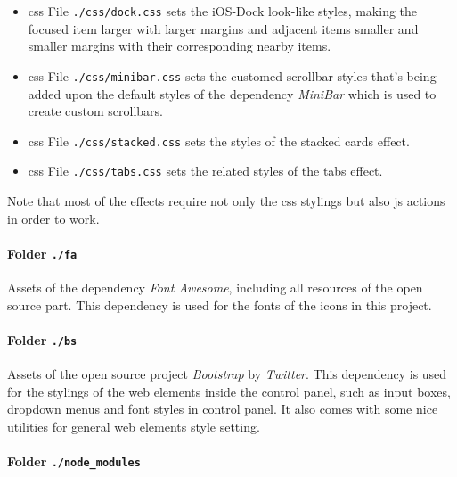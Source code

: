 \begin{itemize}
\item \gls{css} File \texttt{./css/dock.css} sets the iOS-Dock look-like styles, making the focused item larger with larger margins and adjacent items smaller and smaller margins with their corresponding nearby items.
\item \gls{css} File \texttt{./css/minibar.css} sets the customed scrollbar styles that's being added upon the default styles of the dependency \emph{MiniBar} which is used to create custom scrollbars.
\item \gls{css} File \texttt{./css/stacked.css} sets the styles of the stacked cards effect.
\item \gls{css} File \texttt{./css/tabs.css} sets the related styles of the tabs effect.
\end{itemize}

Note that most of the effects require not only the \gls{css} stylings but also \gls{js} actions in order to work.

\paragraph{Folder \texttt{./fa}}

Assets of the dependency \emph{Font Awesome}, including all resources of the open source part. This dependency is used for the fonts of the icons in this project.

\paragraph{Folder \texttt{./bs}}

Assets of the open source project \emph{Bootstrap} by \emph{Twitter}. This dependency is used for the stylings of the web elements inside the control panel, such as input boxes, dropdown menus and font styles in control panel. It also comes with some nice utilities for general web elements style setting.

\paragraph{Folder \texttt{./node\_modules}}

